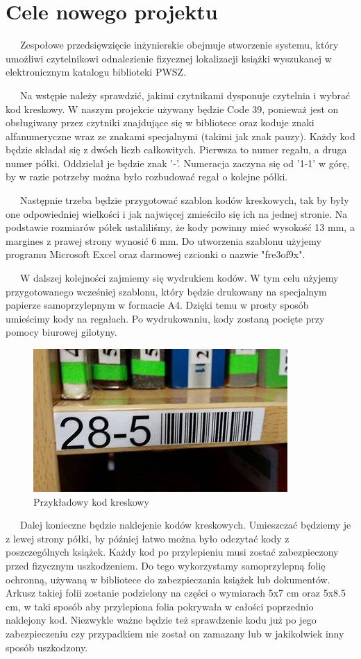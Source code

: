 \section{Cele nowego projektu} 
~~~Zespołowe przedsięwzięcie inżynierskie obejmuje stworzenie systemu, który umożliwi czytelnikowi odnalezienie fizycznej lokalizacji książki wyszukanej w elektronicznym katalogu biblioteki PWSZ. 

~~~Na wstępie należy sprawdzić, jakimi czytnikami dysponuje czytelnia i wybrać kod kreskowy. W naszym projekcie używany będzie Code 39, ponieważ jest on obsługiwany przez czytniki znajdujące się w bibliotece oraz koduje znaki alfanumeryczne wraz ze znakami specjalnymi (takimi jak znak pauzy). Każdy kod będzie składał się z dwóch liczb całkowitych. Pierwsza to numer regału, a druga numer półki. Oddzielał je będzie znak '-'. Numeracja zaczyna się od '1-1' w górę, by w razie potrzeby można było rozbudować regał o kolejne półki. 

~~~Następnie trzeba będzie przygotować szablon kodów kreskowych, tak by były one odpowiedniej wielkości i jak najwięcej zmieściło się ich na jednej stronie. Na podstawie rozmiarów półek ustaliliśmy, że kody powinny mieć wysokość 13 mm, a margines z prawej strony wynosić 6 mm. Do utworzenia szablonu użyjemy programu Microsoft Excel oraz darmowej czcionki o nazwie "fre3of9x". 

~~~W dalszej kolejności zajmiemy się wydrukiem kodów. W tym celu użyjemy przygotowanego wcześniej szablonu, który będzie drukowany na specjalnym papierze samoprzylepnym w formacie A4. Dzięki temu w prosty sposób umieścimy kody na regałach. Po wydrukowaniu, kody zostaną pocięte przy pomocy biurowej gilotyny. 

\begin{figure}[H]
\begin{center}
\includegraphics[scale=0.7]{czlonkowie/1/b2.jpg}
\caption{Przykładowy kod kreskowy}
\end{center}
\end{figure}
~~~Dalej konieczne będzie naklejenie kodów kreskowych. Umieszczać będziemy je z lewej strony półki, by później łatwo można było odczytać kody z poszczególnych książek. Każdy kod po przylepieniu musi zostać zabezpieczony przed fizycznym uszkodzeniem. Do tego wykorzystamy samoprzylepną folię ochronną, używaną w bibliotece do zabezpieczania książek lub dokumentów. Arkusz takiej folii zostanie podzielony na części o wymiarach 5x7 cm oraz 5x8.5 cm, w taki sposób aby przylepiona folia pokrywała w całości poprzednio naklejony kod. Niezwykle ważne będzie też sprawdzenie kodu już po jego zabezpieczeniu czy przypadkiem nie został on zamazany lub w jakikolwiek inny sposób uszkodzony. 

